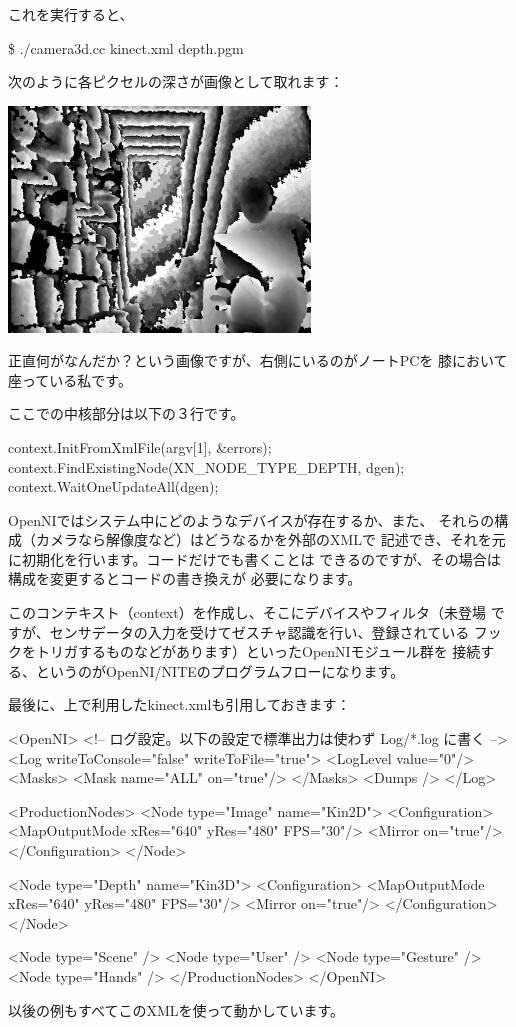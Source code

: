 \documentclass[mingoth,a4paper]{jsarticle}
\begin{document}
これを実行すると、
\begin{commandline}
\$ ./camera3d.cc kinect.xml depth.pgm
\end{commandline}
次のように各ピクセルの深さが画像として取れます：
\begin{center}
\includegraphics[height=6cm]{image201101/depth.eps}
\end{center}
正直何がなんだか？という画像ですが、右側にいるのがノートPCを
膝において座っている私です。

ここでの中核部分は以下の３行です。
\begin{commandline}
context.InitFromXmlFile(argv[1], &errors);
context.FindExistingNode(XN_NODE_TYPE_DEPTH, dgen);
context.WaitOneUpdateAll(dgen);
\end{commandline}

OpenNIではシステム中にどのようなデバイスが存在するか、また、
それらの構成（カメラなら解像度など）はどうなるかを外部のXMLで
記述でき、それを元に初期化を行います。コードだけでも書くことは
できるのですが、その場合は構成を変更するとコードの書き換えが
必要になります。

このコンテキスト（context）を作成し、そこにデバイスやフィルタ（未登場
ですが、センサデータの入力を受けてゼスチャ認識を行い、登録されている
フックをトリガするものなどがあります）といったOpenNIモジュール群を
接続する、というのがOpenNI/NITEのプログラムフローになります。

最後に、上で利用したkinect.xmlも引用しておきます：
\begin{commandline}
<OpenNI>
  <!-- ログ設定。以下の設定で標準出力は使わず Log/*.log に書く -->
  <Log writeToConsole="false" writeToFile="true">
    <LogLevel value="0"/>
    <Masks>
      <Mask name="ALL" on="true"/>
    </Masks>
    <Dumps />
  </Log>

  <ProductionNodes>
    <Node type="Image" name="Kin2D">
      <Configuration>
        <MapOutputMode xRes="640" yRes="480" FPS="30"/>
        <Mirror on="true"/>
      </Configuration>
    </Node>

    <Node type="Depth" name="Kin3D">
      <Configuration>
        <MapOutputMode xRes="640" yRes="480" FPS="30"/>
        <Mirror on="true"/>
      </Configuration>
    </Node>

    <Node type="Scene" />
    <Node type="User" />
    <Node type="Gesture" />
    <Node type="Hands" />
  </ProductionNodes>
</OpenNI>
\end{commandline}
以後の例もすべてこのXMLを使って動かしています。
\end{document}
